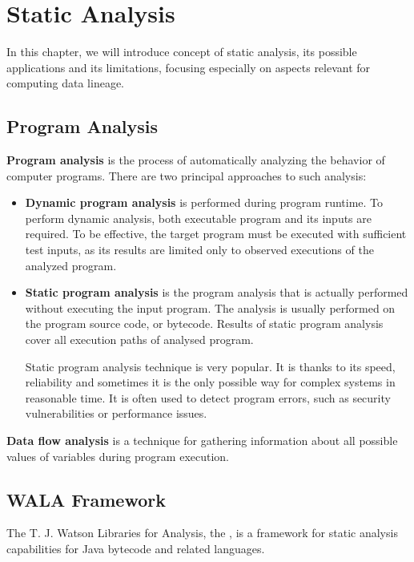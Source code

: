 
\chapter{Static Analysis \label{chapter:analysis}}

In this chapter, we will introduce concept of static analysis,
its possible applications and its limitations,
focusing especially on aspects relevant for computing data lineage.



\section{Program Analysis}

\textbf{Program analysis} is the process of automatically analyzing the behavior
of computer programs. There are two principal approaches to such analysis:
\begin{itemize}
  \item \textbf{Dynamic program analysis} is performed during program runtime.
    To perform dynamic analysis, both executable program
    and its inputs are required. To be effective, the target program
    must be executed with sufficient test inputs, as its results
    are limited only to observed executions of the analyzed program.
  \item \textbf{Static program analysis} is the program analysis that is actually
    performed without executing the input program. The analysis is usually
    performed on the program source code, or bytecode.
    Results of static program analysis cover all execution paths of
    analysed program.

    Static program analysis technique is very popular. It is thanks
    to its speed, reliability and sometimes it is the only possible
    way for complex systems in reasonable time.
    It is often used to detect program errors, such as
    security vulnerabilities or performance issues.
\end{itemize}

\textbf{Data flow analysis} is a technique for gathering information about
all possible values of variables during program execution.



\section{WALA Framework \label{chapter:analysis:wala}}

The T. J. Watson Libraries for Analysis, the \citet{WalaFramework},
is a framework for static analysis capabilities for Java
bytecode and related languages.

